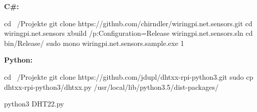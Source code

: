 \textbf{C\#:}

\begin{console}
	cd ~/Projekte
	git clone https://github.com/chirndler/wiringpi.net.sensors.git
	cd wiringpi.net.sensors
	xbuild /p:Configuration=Release wiringpi.net.sensors.sln
	cd bin/Release/
	sudo mono wiringpi.net.sensors.sample.exe 1
\end{console}

\textbf{Python:}
\begin{console}
	cd ~/Projekte
	git clone https://github.com/jdupl/dhtxx-rpi-python3.git
	sudo cp dhtxx-rpi-python3/dhtxx.py /usr/local/lib/python3.5/dist-packages/
\end{console}

\lstset{language=Python, caption=, 
        label=DHT22Program, frame=single, basicstyle=\ttfamily
	      \footnotesize, breakatwhitespace=false, showstringspaces=false, 
        showtabs=false, tabsize=2 }


\begin{console}
	python3 DHT22.py
\end{console}
